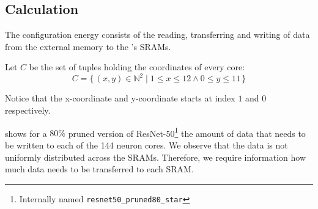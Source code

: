 
\subsection{Calculation}
The configuration energy consists of the reading, transferring and writing of data from the external memory to the \graicore{}'s SRAMs. 

Let $C$ be the set of tuples holding the coordinates of every core:
\begin{equation*}
    C = \{\,\left(x,y\right) \in \mathbb{N}^2 \mid 1 \leq x \leq 12 \wedge 0 \leq y \leq 11 \,\} 
\end{equation*}

Notice that the x-coordinate and y-coordinate starts at index $1$ and $0$ respectively.

 shows for a $80\%$ pruned version of ResNet-50\footnote{Internally named \texttt{resnet50\_pruned80\_star}} the amount of data that needs to be written to each of the 144 neuron cores.
We observe that the data is not uniformly distributed across the SRAMs.
Therefore, we require information how much data needs to be transferred to each SRAM.

